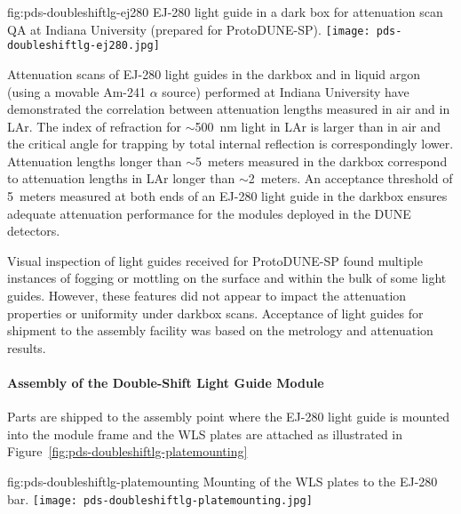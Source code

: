 \begin{dunefigure}{fig:pds-doubleshiftlg-ej280}
{EJ-280 light guide in a dark box for attenuation scan QA at Indiana University (prepared for ProtoDUNE-SP).}
  \texttt{[image: pds-doubleshiftlg-ej280.jpg]}
\end{dunefigure}

Attenuation scans of EJ-280 light guides in the darkbox and in liquid argon (using a movable Am-241 $\alpha$ source) performed at Indiana University have demonstrated the correlation between attenuation lengths measured in air and in LAr. The index of refraction for $\sim$500~nm light in LAr is larger than in air and the critical angle for trapping by total internal reflection is correspondingly lower. Attenuation lengths longer than $\sim$5~meters measured in the darkbox correspond to attenuation lengths in LAr longer than $\sim$2~meters. An acceptance threshold of 5~meters measured at both ends of an EJ-280 light guide in the darkbox ensures adequate attenuation performance for the modules deployed in the DUNE detectors.

Visual inspection of light guides received for ProtoDUNE-SP found multiple instances of fogging or mottling on the surface and within the bulk of some light guides. However, these features did not appear to impact the attenuation properties or uniformity under darkbox scans. Acceptance of light guides for shipment to the assembly facility was based on the metrology and attenuation results.

\paragraph*{Assembly of the Double-Shift Light Guide Module}

Parts are shipped to the assembly point where the EJ-280 light guide is mounted into the module frame and the WLS plates are attached as illustrated in Figure~\ref{fig:pds-doubleshiftlg-platemounting}

\begin{dunefigure}{fig:pds-doubleshiftlg-platemounting}
{Mounting of the WLS plates to the EJ-280 bar.}
  \texttt{[image: pds-doubleshiftlg-platemounting.jpg]}
\end{dunefigure}



